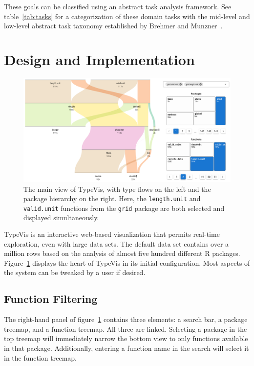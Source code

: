 \documentclass{vgtc}                          %
\newcommand{\typevis}{{\sc TypeVis}\xspace}
\begin{document}
These goals can be classified using an abstract task analysis framework.
See table~\ref{tab:tasks} for a categorization of these domain tasks
with the mid-level and low-level abstract task taxonomy
established by Brehmer and Munzner~\cite{brehmer:2013}.


\section{Design and Implementation}

\begin{figure}
 \centering
 \includegraphics[width=\linewidth]{img/typevis.png}
 \caption{The main view of \typevis, with type flows on the left and the package hierarchy on the right. Here, the {\tt length.unit} and {\tt valid.unit} functions from the {\tt grid} package are both selected and displayed simultaneously.}
 \label{fig:typevis}
\end{figure}

\typevis is an interactive web-based visualization
that permits real-time exploration,
even with large data sets.
The default data set contains over a million rows
based on the analysis of almost five hundred
different R packages.
Figure~\ref{fig:typevis} displays
the heart of \typevis
in its initial configuration.
Most aspects of the system can be tweaked
by a user if desired.

\subsection{Function Filtering}

The right-hand panel of figure~\ref{fig:typevis}
contains three elements: a search bar,
a package treemap,
and a function treemap.
All three are linked.
Selecting a package
in the top treemap will immediately narrow the
bottom view to only functions available in that package.
Additionally, entering a function name in the search
will select it in the function treemap.
\end{document}
